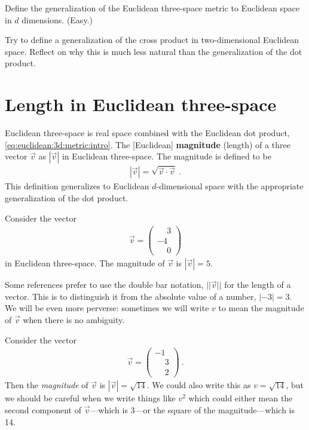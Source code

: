 \documentclass[12pt, oneside]{report}    %
\let\oldsection\section
\def\section{%
  \setcounter{sidenote}{1}%
  \oldsection
}
\begin{document}
\begin{exercise}
Define the generalization of the Euclidean three-space metric to Euclidean space in $d$ dimensions. (Easy.)
\end{exercise}

\begin{exercise}
Try to define a generalization of the cross product in two-dimensional Euclidean space. Reflect on why this is much less natural than the generalization of the dot product. 
\end{exercise}



\section{Length in Euclidean three-space}
\label{sec:Euclidean:three:length}

Euclidean three-space is real space combined with the Euclidean dot product, \eqref{eq:euclidean:3d:metric:intro}. The [Euclidean] \textbf{magnitude} (length) of a three vector $\vec{v}$ as $|\vec{v}|$ in Euclidean three-space. The magnitude is defined to be
\begin{align}
    |\vec{v}| = \sqrt{\vec{v}\cdot\vec{v}} \ .
\end{align}
This definition generalizes to Euclidean $d$-dimensional space with the appropriate generalization of the dot product.

\begin{example}
Consider the vector
\begin{align}
    \vec{v} = 
    \begin{pmatrix}
    \phantom{+}3\\-4\\\phantom{+}0    
    \end{pmatrix}
\end{align}
in Euclidean three-space. The magnitude of $\vec{v}$ is $|\vec{v}| = 5$.
\end{example}


Some references prefer to use the double bar notation, $||\vec{v}||$ for the length of a vector. This is to distinguish it from the absolute value of a number, $|-3| = 3$. We will be even more perverse: sometimes we will write $v$ to mean the magnitude of $\vec{v}$ when there is no ambiguity.

\begin{example}
Consider the vector
\begin{align}
    \vec{v} = 
    \begin{pmatrix}
    -1\\ \phantom{+}3\\ \phantom{+}2
    \end{pmatrix} \ .
\end{align}
Then the \emph{magnitude} of $\vec{v}$ is $|\vec{v}|=\sqrt{14}$. We could also write this as $v = \sqrt{14}$, but we should be careful when we write things like $v^2$ which could either mean the second component of $\vec{v}$---which is $3$---or the square of the magnitude---which is 14. 
\end{example}
\end{document}
